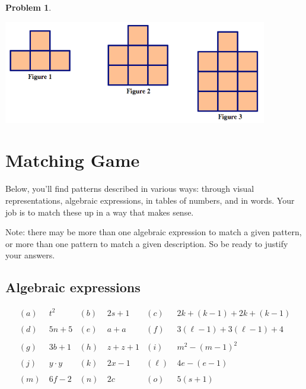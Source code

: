 \documentclass[12pt, reqno]{amsart}
\theoremstyle{remark}
\theoremstyle{definition}
\newtheorem{problem}{Problem}
\numberwithin{equation}{section}  %
\begin{document}
\begin{problem}\ 

\begin{center}
\includegraphics[height=4.5cm]{pattern6}
\end{center}

\end{problem}



\newpage





\section{Matching Game}\label{sec: matching}
Below, you'll find patterns described in various ways: through visual representations, algebraic expressions, in tables of numbers, and in words.  Your job is to match these up in a way that makes sense.    

 Note: there may be more than one algebraic expression to match a given pattern, or more than one pattern to match a given description.  So be ready to justify your answers.

\subsection*{Algebraic expressions}

\begin{align*}
(a) & \  t^2 
&
(b) & \  2s + 1 
&
(c) & \  2k + (k-1) + 2k + (k-1)
\\
\\
(d) & \  5n + 5
& 
(e) & \ a + a
& 
(f) & \ 3(\ell - 1) + 3 (\ell - 1) + 4
\\
\\
(g) & \  3b + 1
& 
(h) & \ z+ z+ 1
& 
(i) & \ m^2 - (m-1)^2
\\
\\
(j) & \  y\cdot y
& 
(k) & \  2x - 1
& 
(\ell) & \ 4e - (e-1)
\\
\\
(m) & \  6f - 2
& 
(n) & \  2c
& 
(o) & \ 5(s+1)
\end{align*}
\end{document}
